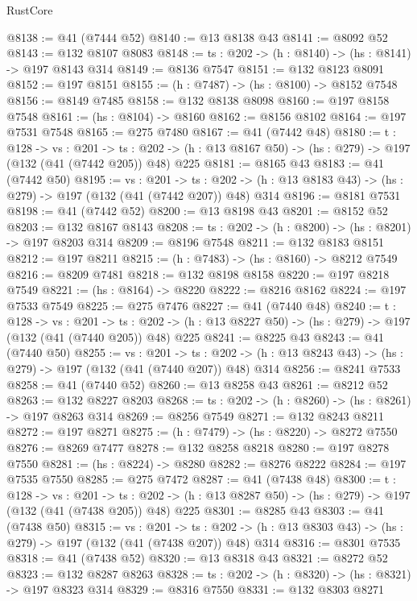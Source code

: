 \begin{lexlean}{RustCore}
\begin{coremodule}
@8138 := @41 (@7444 @52)
@8140 := @13 @8138 @43
@8141 := @8092 @52
@8143 := @132 @8107 @8083
@8148 := {ts : @202} -> (h : @8140) -> (hs : @8141) -> @197 @8143 @314
@8149 := @8136 @7547
@8151 := @132 @8123 @8091
@8152 := @197 @8151
@8155 := (h : @7487) -> (hs : @8100) -> @8152 @7548
@8156 := @8149 @7485
@8158 := @132 @8138 @8098
@8160 := @197 @8158 @7548
@8161 := (hs : @8104) -> @8160
@8162 := @8156 @8102
@8164 := @197 @7531 @7548
@8165 := @275 @7480
@8167 := @41 (@7442 @48)
@8180 := {t : @128} ->
  {vs : @201} ->
  {ts : @202} -> (h : @13 @8167 @50) -> (hs : @279) -> @197 (@132 (@41 (@7442 @205)) @48) @225
@8181 := @8165 @43
@8183 := @41 (@7442 @50)
@8195 := {vs : @201} ->
  {ts : @202} -> (h : @13 @8183 @43) -> (hs : @279) -> @197 (@132 (@41 (@7442 @207)) @48) @314
@8196 := @8181 @7531
@8198 := @41 (@7442 @52)
@8200 := @13 @8198 @43
@8201 := @8152 @52
@8203 := @132 @8167 @8143
@8208 := {ts : @202} -> (h : @8200) -> (hs : @8201) -> @197 @8203 @314
@8209 := @8196 @7548
@8211 := @132 @8183 @8151
@8212 := @197 @8211
@8215 := (h : @7483) -> (hs : @8160) -> @8212 @7549
@8216 := @8209 @7481
@8218 := @132 @8198 @8158
@8220 := @197 @8218 @7549
@8221 := (hs : @8164) -> @8220
@8222 := @8216 @8162
@8224 := @197 @7533 @7549
@8225 := @275 @7476
@8227 := @41 (@7440 @48)
@8240 := {t : @128} ->
  {vs : @201} ->
  {ts : @202} -> (h : @13 @8227 @50) -> (hs : @279) -> @197 (@132 (@41 (@7440 @205)) @48) @225
@8241 := @8225 @43
@8243 := @41 (@7440 @50)
@8255 := {vs : @201} ->
  {ts : @202} -> (h : @13 @8243 @43) -> (hs : @279) -> @197 (@132 (@41 (@7440 @207)) @48) @314
@8256 := @8241 @7533
@8258 := @41 (@7440 @52)
@8260 := @13 @8258 @43
@8261 := @8212 @52
@8263 := @132 @8227 @8203
@8268 := {ts : @202} -> (h : @8260) -> (hs : @8261) -> @197 @8263 @314
@8269 := @8256 @7549
@8271 := @132 @8243 @8211
@8272 := @197 @8271
@8275 := (h : @7479) -> (hs : @8220) -> @8272 @7550
@8276 := @8269 @7477
@8278 := @132 @8258 @8218
@8280 := @197 @8278 @7550
@8281 := (hs : @8224) -> @8280
@8282 := @8276 @8222
@8284 := @197 @7535 @7550
@8285 := @275 @7472
@8287 := @41 (@7438 @48)
@8300 := {t : @128} ->
  {vs : @201} ->
  {ts : @202} -> (h : @13 @8287 @50) -> (hs : @279) -> @197 (@132 (@41 (@7438 @205)) @48) @225
@8301 := @8285 @43
@8303 := @41 (@7438 @50)
@8315 := {vs : @201} ->
  {ts : @202} -> (h : @13 @8303 @43) -> (hs : @279) -> @197 (@132 (@41 (@7438 @207)) @48) @314
@8316 := @8301 @7535
@8318 := @41 (@7438 @52)
@8320 := @13 @8318 @43
@8321 := @8272 @52
@8323 := @132 @8287 @8263
@8328 := {ts : @202} -> (h : @8320) -> (hs : @8321) -> @197 @8323 @314
@8329 := @8316 @7550
@8331 := @132 @8303 @8271

\end{coremodule}
\end{lexlean}
